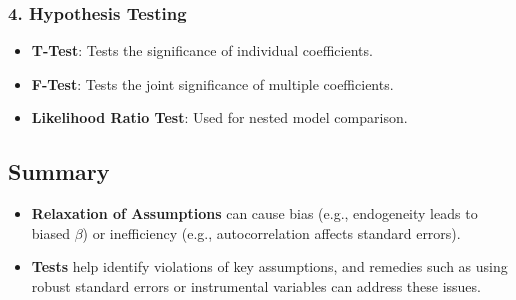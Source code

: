 \documentclass[
]{article}
\providecommand{\tightlist}{%
  \setlength{\itemsep}{0pt}\setlength{\parskip}{0pt}}\usepackage{longtable,booktabs,array}
\begin{document}
\subsubsection{\texorpdfstring{\textbf{4. Hypothesis
Testing}}{4. Hypothesis Testing}}\label{hypothesis-testing}

\begin{itemize}
\tightlist
\item
  \textbf{T-Test}: Tests the significance of individual coefficients.
\item
  \textbf{F-Test}: Tests the joint significance of multiple
  coefficients.
\item
  \textbf{Likelihood Ratio Test}: Used for nested model comparison.
\end{itemize}

\subsection{\texorpdfstring{\textbf{Summary}}{Summary}}\label{summary}

\begin{itemize}
\tightlist
\item
  \textbf{Relaxation of Assumptions} can cause bias (e.g., endogeneity
  leads to biased \(\beta\)) or inefficiency (e.g., autocorrelation
  affects standard errors).
\item
  \textbf{Tests} help identify violations of key assumptions, and
  remedies such as using robust standard errors or instrumental
  variables can address these issues.
\end{itemize}
\end{document}
